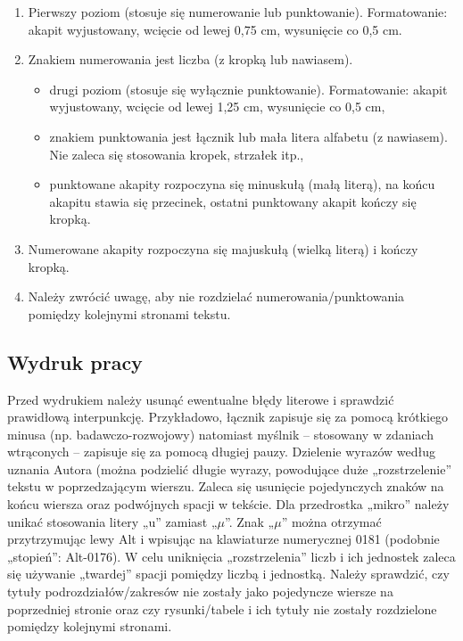 \documentclass[12pt,twoside]{article}
\begin{document}
\begin{enumerate}[label=\arabic*), leftmargin=1.25cm]
	\item Pierwszy poziom (stosuje się numerowanie lub punktowanie). Formatowanie:
	akapit wyjustowany, wcięcie od lewej 0,75 cm, wysunięcie co 0,5 cm.
	\item Znakiem numerowania jest liczba (z kropką lub nawiasem).
		\begin{itemize}[label=-,labelsep=0.4cm,leftmargin=0.6cm]
			\item drugi poziom (stosuje się wyłącznie punktowanie). Formatowanie: akapit
			wyjustowany, wcięcie od lewej 1,25 cm, wysunięcie co 0,5 cm,
			\item znakiem punktowania jest łącznik lub mała litera alfabetu (z nawiasem). Nie
			zaleca się stosowania kropek, strzałek itp.,
			\item punktowane akapity rozpoczyna się minuskułą (małą literą), na końcu akapitu
			stawia się przecinek, ostatni punktowany akapit kończy się kropką.
		\end{itemize}
	\item Numerowane akapity rozpoczyna się majuskułą (wielką literą) i kończy kropką.
	\item Należy zwrócić uwagę, aby nie rozdzielać numerowania/punktowania pomiędzy
	kolejnymi stronami tekstu.
\end{enumerate}


{\subsection{Wydruk pracy}}

Przed wydrukiem należy usunąć ewentualne błędy literowe i sprawdzić prawidłową
interpunkcję. Przykładowo, łącznik zapisuje się za pomocą krótkiego minusa (np.
badawczo-rozwojowy) natomiast myślnik -- stosowany w zdaniach wtrąconych -- zapisuje
się za pomocą długiej pauzy. Dzielenie wyrazów według uznania Autora (można podzielić
długie wyrazy, powodujące duże „rozstrzelenie” tekstu w poprzedzającym wierszu. Zaleca się usunięcie pojedynczych znaków na końcu wiersza oraz podwójnych spacji w tekście.
Dla przedrostka „mikro” należy unikać stosowania litery „u” zamiast „$\mu$”. Znak „$\mu$” można
otrzymać przytrzymując lewy Alt i wpisując na klawiaturze numerycznej 0181 (podobnie
„stopień”: Alt-0176). W celu uniknięcia „rozstrzelenia” liczb i ich jednostek zaleca się
używanie „twardej” spacji pomiędzy liczbą i jednostką. Należy sprawdzić, czy tytuły
podrozdziałów/zakresów nie zostały jako pojedyncze wiersze na poprzedniej stronie oraz
czy rysunki/tabele i ich tytuły nie zostały rozdzielone pomiędzy kolejnymi stronami.
\end{document}
